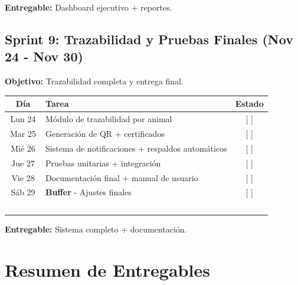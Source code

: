 \documentclass[11pt,a4paper]{article}
\begin{document}
\textbf{Entregable:} Dashboard ejecutivo + reportes.

\vspace{0.5cm}

\subsection*{Sprint 9: Trazabilidad y Pruebas Finales (Nov 24 - Nov 30)}

\textbf{Objetivo:} Trazabilidad completa y entrega final.

\begin{center}
\begin{tabularx}{\textwidth}{|c|X|c|}
\hline
\rowcolor{verdeclaro}
\textbf{Día} & \textbf{Tarea} & \textbf{Estado} \\
\hline
Lun 24 & Módulo de trazabilidad por animal & [ ] \\
\hline
Mar 25 & Generación de QR + certificados & [ ] \\
\hline
Mié 26 & Sistema de notificaciones + respaldos automáticos & [ ] \\
\hline
Jue 27 & Pruebas unitarias + integración & [ ] \\
\hline
Vie 28 & Documentación final + manual de usuario & [ ] \\
\hline
\rowcolor{verdeclaro}
Sáb 29 & \textbf{Buffer} - Ajustes finales & [ ] \\
\hline
\rowcolor{verde}
\textcolor{white}{Dom 30} & \textcolor{white}{\textbf{ENTREGA FINAL}} & \textcolor{white}{[ ]} \\
\hline
\end{tabularx}
\end{center}

\textbf{Entregable:} Sistema completo + documentación.

\newpage


\section*{Resumen de Entregables}
\end{document}
